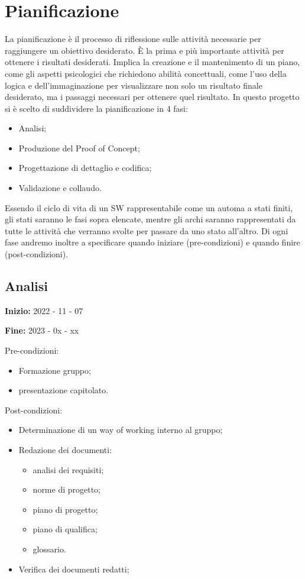 \chapter{Pianificazione}
La pianificazione è il processo di riflessione sulle attività necessarie per raggiungere un obiettivo desiderato. È la prima e più importante attività per ottenere i risultati desiderati. Implica la creazione e il mantenimento di un piano, come gli aspetti psicologici che richiedono abilità concettuali, come l'uso della logica e dell'immaginazione per visualizzare non solo un risultato finale desiderato, ma i passaggi necessari per ottenere quel risultato. In questo progetto si è scelto di suddividere la pianificazione in 4 fasi: 
\begin{itemize}
    \item Analisi;
    \item Produzione del Proof of Concept;
    \item Progettazione di dettaglio e codifica;
    \item Validazione e collaudo.
\end{itemize}
Essendo il ciclo di vita di un SW rappresentabile come un automa a stati finiti, gli stati saranno le fasi sopra elencate, mentre gli archi saranno rappresentati da tutte le attività che verranno svolte per passare da uno stato all'altro. Di ogni fase andremo inoltre a specificare quando iniziare (pre-condizioni) e quando finire (post-condizioni).

\section{Analisi}

\textbf{Inizio:} 2022 - 11 - 07 

\textbf{Fine:} 2023 - 0x - xx


Pre-condizioni:
\begin{itemize}
    \item Formazione gruppo;
    \item presentazione capitolato.
\end{itemize}

Post-condizioni:
    \begin{itemize}
        \item Determinazione di un way of working interno al gruppo;
        \item Redazione dei documenti:
        \begin{itemize}
            \item analisi dei requisiti;
            \item norme di progetto;
            \item piano di progetto;
            \item piano di qualifica;
            \item glossario.
        \end{itemize}
        \item Verifica dei documenti redatti;
    \end{itemize}


